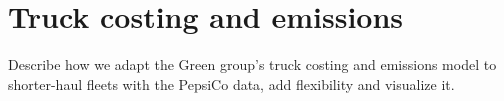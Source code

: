 \section{Truck costing and emissions}
\label{sec:costs_emissions}
Describe how we adapt the Green group's truck costing and emissions model to shorter-haul fleets with the PepsiCo data, add flexibility and visualize it.